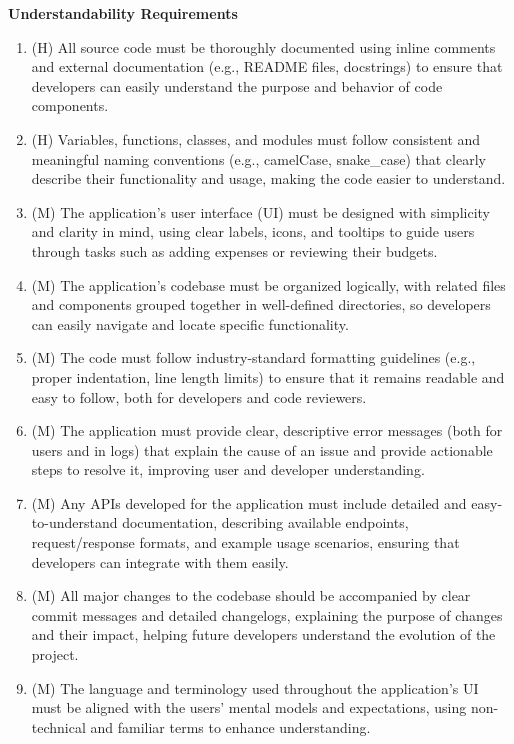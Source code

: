 \documentclass[12pt]{article}
\begin{document}
\textbf{Understandability Requirements}\label{NFR-UND}
\begin{enumerate}[label=NFR-UND-\arabic*]
  \item (H) All source code must be thoroughly documented using inline comments
  and external documentation (e.g., README files, docstrings) to ensure that
  developers can easily understand the purpose and behavior of code components.
  \item (H) Variables, functions, classes, and modules must follow consistent
  and meaningful naming conventions (e.g., camelCase, snake\_case) that clearly
  describe their functionality and usage, making the code easier to understand.
  \item (M) The application's user interface (UI) must be designed with
  simplicity and clarity in mind, using clear labels, icons, and tooltips to
  guide users through tasks such as adding expenses or reviewing their budgets.
  \item (M) The application's codebase must be organized logically, with related
  files and components grouped together in well-defined directories, so
  developers can easily navigate and locate specific functionality.
  \item (M) The code must follow industry-standard formatting guidelines (e.g.,
  proper indentation, line length limits) to ensure that it remains readable and
  easy to follow, both for developers and code reviewers.
  \item (M) The application must provide clear, descriptive error messages (both
  for users and in logs) that explain the cause of an issue and provide
  actionable steps to resolve it, improving user and developer understanding.
  \item (M) Any APIs developed for the application must include detailed and
  easy-to-understand documentation, describing available endpoints,
  request/response formats, and example usage scenarios, ensuring that
  developers can integrate with them easily.
  \item (M) All major changes to the codebase should be accompanied by clear
  commit messages and detailed changelogs, explaining the purpose of changes and
  their impact, helping future developers understand the evolution of the
  project.
  \item (M) The language and terminology used throughout the application's UI
  must be aligned with the users' mental models and expectations, using
  non-technical and familiar terms to enhance understanding.
\end{enumerate}
\end{document}
